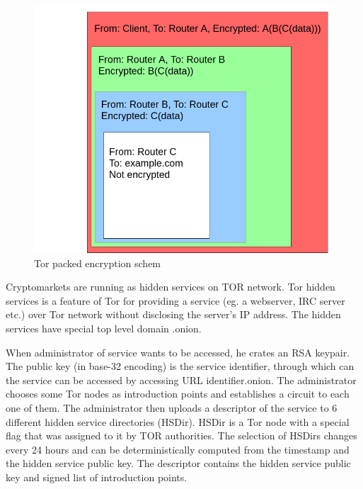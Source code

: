 \documentclass[
  digital, %
  table,   %
  lof,     %
  lot,     %
  oneside
]{fithesis3}
\begin{document}
\begin{figure}[!htb]
    \centering
    \includegraphics[width=1\textwidth]{tor-packet}
    \caption{Tor packed encryption schem}
    \label{Tor packed encryption schema}
\end{figure}
 
Cryptomarkets are running as hidden services on TOR network.
Tor hidden services is a feature of Tor for providing a service (eg. a webserver, IRC server etc.) over Tor network
without disclosing the server's IP address. The hidden services have special top level domain .onion.

When administrator of service wants to be accessed, he crates an RSA keypair.
The public key (in base-32 encoding) is the service identifier, through which can the service can be accessed by accessing URL identifier.onion.
The administrator chooses some Tor nodes as introduction points and establishes a circuit to each one of them.
The administrator then uploads a descriptor of the service to 6 different hidden service directories (HSDir).
HSDir is a Tor node with a special flag that was assigned to it by TOR authorities.
The selection of HSDirs changes every 24 hours and can be deterministically computed from the timestamp and the hidden service public key.
The descriptor contains the hidden service public key and signed list of introduction points.
\end{document}
